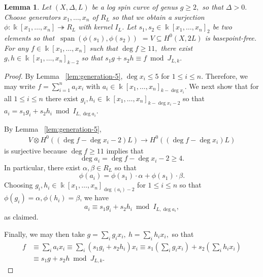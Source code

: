 \documentclass{amsart}
\theoremstyle{plain}
\newtheorem{lem}[thm]{Lemma}
\theoremstyle{definition}
\theoremstyle{remark}
\numberwithin{equation}{section}
\newcommand\Bk{{\Bbbk}}
\newcommand{\halfcan}{L}
\DeclareMathOperator{\newspan}{span}
\begin{document}
\begin{lem}
\label{lem:reducing-degree}
Let $(X, \Delta, \halfcan)$ be a log spin curve of genus $g \geq 2,$ so
that $\Delta > 0.$ Choose generators $x_1, \ldots, x_n$ of $R_\halfcan$ so
that we obtain a surjection $\phi: \Bk[x_1, \ldots, x_n]
\twoheadrightarrow R_\halfcan$ with kernel $I_L$. Let $s_1, s_2 \in \Bk[x_1,
\ldots, x_n]_2$ be two elements so that $\: \newspan(\phi(s_1), \phi(s_2))$
$= V \subseteq H^0(X, 2\halfcan)$ is basepoint-free. For any $f \in
\Bk[x_1, \ldots, x_n]$ such that $\deg f \geq 11,$ there exist $g, h \in
\Bk[x_1, \ldots, x_n]_{k - 2}$ so that $s_1 g + s_2 h \equiv f \bmod J_{\halfcan, k}.$
\end{lem}
\begin{proof}
By Lemma ~\ref{lem:generation-5}, $\deg x_i \leq 5$ for $1 \leq i \leq n$. Therefore, we may write $f = \sum_{i = 1}^{n}a_i x_i$ with $a_i \in \Bk[x_1, \ldots, x_n]_{k-\deg x_i}$.
We next show that for all $1 \leq i \leq n$ there exist $g_i, h_i \in \Bk[x_1, \ldots, x_n]_{k - \deg x_i - 2}$ so that $a_i = s_1g_i + s_2h_i \bmod I_{\halfcan, \deg a_i}.$ 

By Lemma ~\ref{lem:generation-5},
\begin{align*}
	V \otimes H^0((\deg f-\deg x_i -2)\halfcan) \rightarrow H^0((\deg f-\deg x_i)\halfcan)
\end{align*}
is surjective because $\deg f \geq 11$ implies that
$$\deg a_i =\deg f - \deg x_i -2 \geq 4.$$
In particular, there exist $\alpha, \beta \in R_L$ so that
$$\phi(a_i) = \phi(s_1) \cdot \alpha + \phi(s_1) \cdot \beta.$$ 
Choosing $g_i,h_i\in \Bk[x_1, \ldots, x_n]_{\deg(a_i)-2}$ for $1 \leq i \leq n$ so that $\phi(g_i) = \alpha, \phi(h_i) = \beta$, we have 
$$a_i \equiv s_1 g_i + s_2 h_i \bmod I_{\halfcan, \deg a_i},$$ as claimed.

Finally, we may then take $g = \sum_{i}^{}g_i x_i, \: h = \sum_{i}^{}h_i x_i,$ so that 
\begin{align*}
	f &\equiv \sum_{i}^{}a_i x_i \equiv \sum_{i}^{}(s_1g_i + s_2h_i)x_i \equiv s_1 \left( \sum_{i}^{}g_i x_i \right) + s_2 \left( \sum_{i}^{}h_i x_i \right) \\
	&\equiv s_1 g + s_2 h \bmod J_{L,k}.
\end{align*}
\end{proof}
\end{document}
